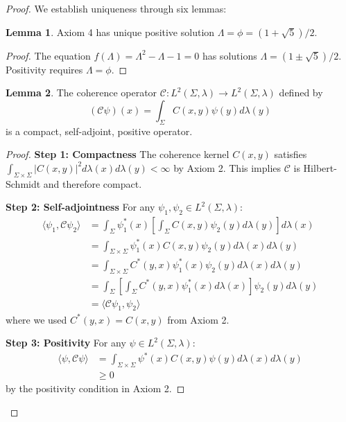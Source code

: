 \documentclass[11pt]{article}
\theoremstyle{definition}
\newtheorem{lemma}{Lemma}[section]
\newcommand{\goldenratio}{\phi}
\newcommand{\coherence}{\mathcal{C}}
\newcommand{\configspace}{\Sigma}
\newcommand{\eigenvector}{\psi}
\begin{document}
\begin{proof}
We establish uniqueness through six lemmas:

\begin{lemma}
Axiom 4 has unique positive solution $\Lambda = \goldenratio = (1+\sqrt{5})/2$.
\end{lemma}
\begin{proof}
The equation $f(\Lambda) = \Lambda^2 - \Lambda - 1 = 0$ has solutions $\Lambda = (1 \pm \sqrt{5})/2$. Positivity requires $\Lambda = \goldenratio$.
\end{proof}

\begin{lemma}
The coherence operator $\coherence: L^2(\configspace,\lambda) \to L^2(\configspace,\lambda)$ defined by
\begin{equation}
(\coherence\eigenvector)(x) = \int_{\configspace} C(x,y)\eigenvector(y) d\lambda(y)
\end{equation}
is a compact, self-adjoint, positive operator.
\end{lemma}
\begin{proof}
\textbf{Step 1: Compactness}
The coherence kernel $C(x,y)$ satisfies $\int_{\configspace \times \configspace} |C(x,y)|^2 d\lambda(x)d\lambda(y) < \infty$ by Axiom 2. This implies $\coherence$ is Hilbert-Schmidt and therefore compact.

\textbf{Step 2: Self-adjointness}
For any $\eigenvector_1, \eigenvector_2 \in L^2(\configspace,\lambda)$:
\begin{align}
\langle \eigenvector_1, \coherence\eigenvector_2 \rangle &= \int_{\configspace} \eigenvector_1^*(x) \left[ \int_{\configspace} C(x,y)\eigenvector_2(y) d\lambda(y) \right] d\lambda(x) \\
&= \int_{\configspace \times \configspace} \eigenvector_1^*(x) C(x,y) \eigenvector_2(y) d\lambda(x)d\lambda(y) \\
&= \int_{\configspace \times \configspace} C^*(y,x) \eigenvector_1^*(x) \eigenvector_2(y) d\lambda(x)d\lambda(y) \\
&= \int_{\configspace} \left[ \int_{\configspace} C^*(y,x) \eigenvector_1^*(x) d\lambda(x) \right] \eigenvector_2(y) d\lambda(y) \\
&= \langle \coherence\eigenvector_1, \eigenvector_2 \rangle
\end{align}
where we used $C^*(y,x) = C(x,y)$ from Axiom 2.

\textbf{Step 3: Positivity}
For any $\eigenvector \in L^2(\configspace,\lambda)$:
\begin{align}
\langle \eigenvector, \coherence\eigenvector \rangle &= \int_{\configspace \times \configspace} \eigenvector^*(x) C(x,y) \eigenvector(y) d\lambda(x)d\lambda(y) \\
&\geq 0
\end{align}
by the positivity condition in Axiom 2.
\end{proof}


\end{proof}
\end{document}
